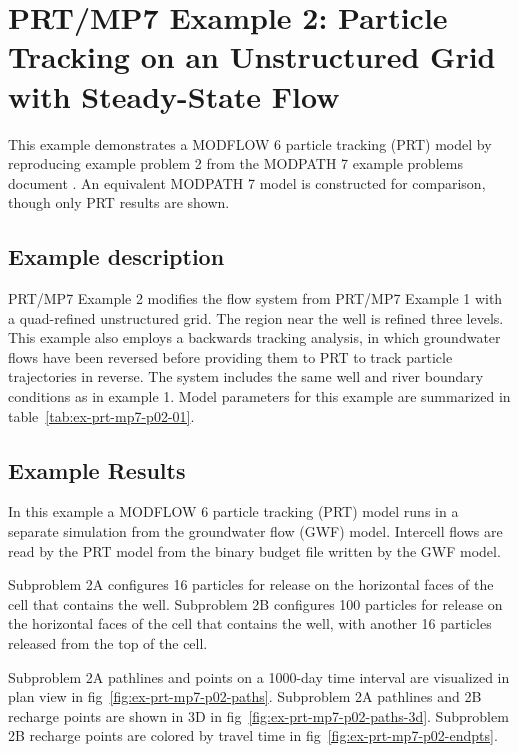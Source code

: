 \section{PRT/MP7 Example 2: Particle Tracking on an Unstructured Grid with Steady-State Flow}

This example demonstrates a MODFLOW 6 particle tracking (PRT) model by reproducing example problem 2 from the MODPATH 7 \citep{pollock2016modpath7} example problems document \citep{modpath7examples}. An equivalent MODPATH 7 model is constructed for comparison, though only PRT results are shown.

\subsection{Example description}

PRT/MP7 Example 2 modifies the flow system from PRT/MP7 Example 1 with a quad-refined unstructured grid. The region near the well is refined three levels. This example also employs a backwards tracking analysis, in which groundwater flows have been reversed before providing them to PRT to track particle trajectories in reverse. The system includes the same well and river boundary conditions as in example 1. Model parameters for this example are summarized in table~\ref{tab:ex-prt-mp7-p02-01}.



\subsection{Example Results}

In this example a MODFLOW 6 particle tracking (PRT) model runs in a separate simulation from the groundwater flow (GWF) model. Intercell flows are read by the PRT model from the binary budget file written by the GWF model.

Subproblem 2A configures 16 particles for release on the horizontal faces of the cell that contains the well. Subproblem 2B configures 100 particles for release on the horizontal faces of the cell that contains the well, with another 16 particles released from the top of the cell.

Subproblem 2A pathlines and points on a 1000-day time interval are visualized in plan view in fig~\ref{fig:ex-prt-mp7-p02-paths}. Subproblem 2A pathlines and 2B recharge points are shown in 3D in fig~\ref{fig:ex-prt-mp7-p02-paths-3d}. Subproblem 2B recharge points are colored by travel time in fig~\ref{fig:ex-prt-mp7-p02-endpts}.

